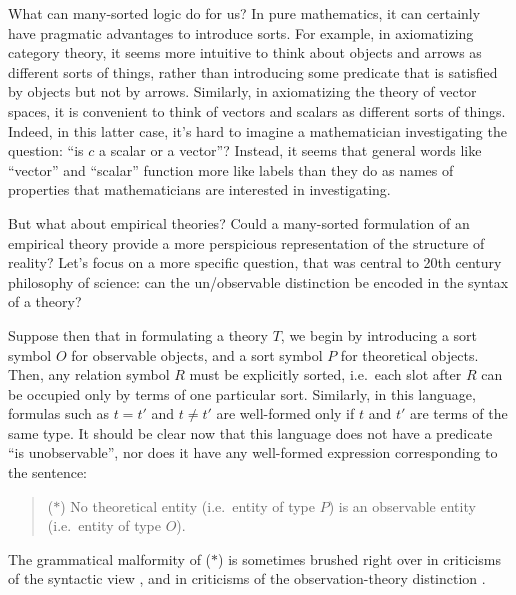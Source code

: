 \begin{disc} What can many-sorted logic do for us?  In pure
  mathematics, it can certainly have pragmatic advantages to introduce
  sorts.  For example, in axiomatizing category theory, it seems more
  intuitive to think about objects and arrows as different sorts of
  things, rather than introducing some predicate that is satisfied by
  objects but not by arrows.  Similarly, in axiomatizing the theory of
  vector spaces, it is convenient to think of vectors and scalars as
  different sorts of things.  Indeed, in this latter case, it's hard
  to imagine a mathematician investigating the question: ``is $c$ a
  scalar or a vector''?  Instead, it seems that general words like
  ``vector'' and ``scalar'' function more like labels than they do as
  names of properties that mathematicians are interested in
  investigating.

  But what about empirical theories?  Could a many-sorted formulation
  of an empirical theory provide a more perspicious representation of
  the structure of reality?  Let's focus on a more specific question,
  that was central to 20th century philosophy of science: can the
  un/observable distinction be encoded in the syntax of a theory?

  Suppose then that in formulating a theory $T$, we begin by
  introducing a sort symbol $O$ for observable objects, and a sort
  symbol $P$ for theoretical objects.  Then, any relation symbol $R$
  must be explicitly sorted, i.e.\ each slot after $R$ can be occupied
  only by terms of one particular sort.  Similarly, in this language,
  formulas such as $t=t'$ and $t\neq t'$ are well-formed only if $t$
  and $t'$ are terms of the same type.  It should be clear now that
  this language does not have a predicate ``is unobservable'', nor
  does it have any well-formed expression corresponding to the
  sentence:
  \begin{quote} ($\ast$) No theoretical entity (i.e.\ entity of type
    $P$) is an observable entity (i.e.\ entity of type
    $O$).  \end{quote} The grammatical malformity of ($\ast$) is
  sometimes brushed right over in criticisms of the syntactic view
  \cite[e.g.][]{bas1980}, and in criticisms of the observation-theory
  distinction \cite[e.g.][]{dick}.
\end{disc}



